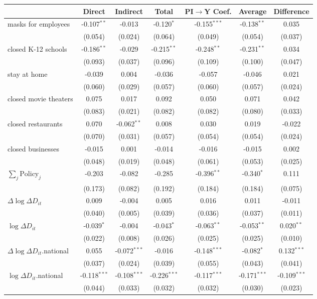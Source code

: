 
\begin{tabular}{lccccc|>{}c}
\toprule
  & Direct & Indirect & Total & PI$\to$Y Coef. & Average & Difference\\
\midrule
masks for employees & -0.107$^{**}$ & -0.013 & -0.120$^{*}$ & -0.155$^{***}$ & -0.138$^{**}$ & 0.035\\
 & (0.054) & (0.024) & (0.064) & (0.049) & (0.054) & (0.037)\\
closed K-12 schools & -0.186$^{**}$ & -0.029 & -0.215$^{**}$ & -0.248$^{**}$ & -0.231$^{**}$ & 0.034\\
 & (0.093) & (0.037) & (0.096) & (0.109) & (0.100) & (0.047)\\
stay at home & -0.039 & 0.004 & -0.036 & -0.057 & -0.046 & 0.021\\
 & (0.060) & (0.029) & (0.057) & (0.060) & (0.057) & (0.024)\\
closed movie theaters & 0.075 & 0.017 & 0.092 & 0.050 & 0.071 & 0.042\\
 & (0.083) & (0.021) & (0.082) & (0.082) & (0.080) & (0.033)\\
closed restaurants & 0.070 & -0.062$^{**}$ & 0.008 & 0.030 & 0.019 & -0.022\\
 & (0.070) & (0.031) & (0.057) & (0.054) & (0.054) & (0.024)\\
closed businesses & -0.015 & 0.001 & -0.014 & -0.016 & -0.015 & 0.002\\
 & (0.048) & (0.019) & (0.048) & (0.061) & (0.053) & (0.025)\\
$\sum_j \mathrm{Policy}_j$ & -0.203 & -0.082 & -0.285 & -0.396$^{**}$ & -0.340$^{*}$ & 0.111\\
 & (0.173) & (0.082) & (0.192) & (0.184) & (0.184) & (0.075)\\
$\Delta \log \Delta D_{it}$ & 0.009 & -0.004 & 0.005 & 0.016 & 0.011 & -0.011\\
 & (0.040) & (0.005) & (0.039) & (0.036) & (0.037) & (0.011)\\
$\log \Delta D_{it}$ & -0.039$^{*}$ & -0.004 & -0.043$^{*}$ & -0.063$^{**}$ & -0.053$^{**}$ & 0.020$^{**}$\\
 & (0.022) & (0.008) & (0.026) & (0.025) & (0.025) & (0.010)\\
$\Delta \log \Delta D_{it}$.national & 0.055 & -0.072$^{***}$ & -0.016 & -0.148$^{***}$ & -0.082$^{*}$ & 0.132$^{***}$\\
 & (0.037) & (0.024) & (0.039) & (0.055) & (0.043) & (0.041)\\
$\log \Delta D_{it}$.national & -0.118$^{***}$ & -0.108$^{***}$ & -0.226$^{***}$ & -0.117$^{***}$ & -0.171$^{***}$ & -0.109$^{***}$\\
 & (0.044) & (0.033) & (0.032) & (0.032) & (0.030) & (0.023)\\
\bottomrule
\end{tabular}